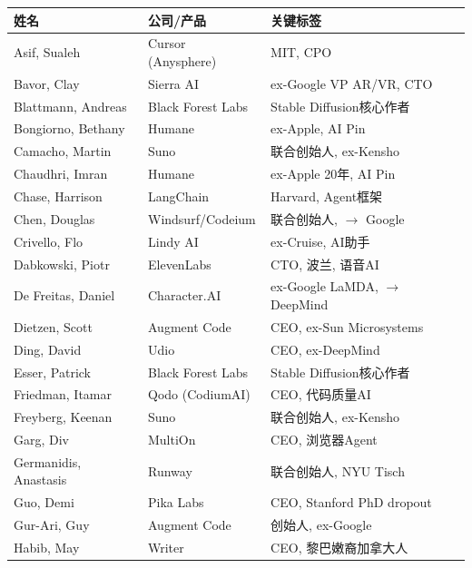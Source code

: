 \begin{keybox}
\small
\begin{tabularx}{\textwidth}{l l X}
\toprule
\rowcolor{figLightGray}
\textbf{姓名} & \textbf{公司/产品} & \textbf{关键标签} \\
\midrule
Asif, Sualeh          & Cursor (Anysphere)   & MIT, CPO \\
Bavor, Clay           & Sierra AI            & ex-Google VP AR/VR, CTO \\
Blattmann, Andreas    & Black Forest Labs    & Stable Diffusion核心作者 \\
Bongiorno, Bethany    & Humane               & ex-Apple, AI Pin \\
Camacho, Martin       & Suno                 & 联合创始人, ex-Kensho \\
Chaudhri, Imran       & Humane               & ex-Apple 20年, AI Pin \\
Chase, Harrison       & LangChain            & Harvard, Agent框架 \\
Chen, Douglas         & Windsurf/Codeium     & 联合创始人, $\to$ Google \\
Crivello, Flo         & Lindy AI             & ex-Cruise, AI助手 \\
Dabkowski, Piotr      & ElevenLabs           & CTO, 波兰, 语音AI \\
De Freitas, Daniel    & Character.AI         & ex-Google LaMDA, $\to$ DeepMind \\
Dietzen, Scott        & Augment Code         & CEO, ex-Sun Microsystems \\
Ding, David           & Udio                 & CEO, ex-DeepMind \\
Esser, Patrick        & Black Forest Labs    & Stable Diffusion核心作者 \\
Friedman, Itamar      & Qodo (CodiumAI)      & CEO, 代码质量AI \\
Freyberg, Keenan      & Suno                 & 联合创始人, ex-Kensho \\
Garg, Div             & MultiOn              & CEO, 浏览器Agent \\
Germanidis, Anastasis & Runway               & 联合创始人, NYU Tisch \\
Guo, Demi             & Pika Labs            & CEO, Stanford PhD dropout \\
Gur-Ari, Guy          & Augment Code         & 创始人, ex-Google \\
Habib, May            & Writer               & CEO, 黎巴嫩裔加拿大人 \\

\end{tabularx}
\end{keybox}
